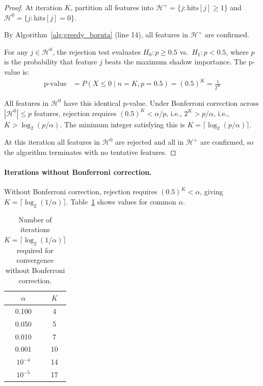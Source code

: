 \documentclass[runningheads]{llncs}
\begin{document}
\begin{proof}
At iteration $K$, partition all features into $\mathcal{H}^+ = \{j : \text{hits}[j] \geq 1\}$ and $\mathcal{H}^0 = \{j : \text{hits}[j] = 0\}$.

By Algorithm~\ref{alg:greedy_boruta} (line 14), all features in $\mathcal{H}^+$ are confirmed.

For any $j \in \mathcal{H}^0$, the rejection test evaluates $H_0: p \geq 0.5$ vs.\ $H_1: p < 0.5$, where $p$ is the probability that feature $j$ beats the maximum shadow importance. The p-value is:
\begin{align*}
\text{p-value} &= P(X \leq 0 \mid n = K, p = 0.5) = (0.5)^K = \frac{1}{2^K}
\end{align*}

All features in $\mathcal{H}^0$ have this identical p-value. Under Bonferroni correction across $|\mathcal{H}^0| \leq p$ features, rejection requires $(0.5)^K < \alpha/p$, i.e., $2^K > p/\alpha$, i.e., $K > \log_2(p/\alpha)$. The minimum integer satisfying this is $K = \lceil \log_2(p/\alpha) \rceil$.

At this iteration all features in $\mathcal{H}^0$ are rejected and all in $\mathcal{H}^+$ are confirmed, so the algorithm terminates with no tentative features.
\end{proof}

\paragraph{Iterations without Bonferroni correction.} Without Bonferroni correction, rejection requires $(0.5)^K < \alpha$, giving $K = \lceil \log_2(1/\alpha) \rceil$. Table~\ref{tab:iterations_alpha_no_bonf} shows values for common $\alpha$.

\begin{table}[h]
\centering
\caption{Number of iterations $K = \lceil \log_2(1/\alpha) \rceil$ required for convergence without Bonferroni correction.}
\label{tab:iterations_alpha_no_bonf}
\begin{tabular}{cc}
\toprule
$\alpha$ & $K$ \\
\midrule
0.100 & 4 \\
0.050 & 5 \\
0.010 & 7 \\
0.001 & 10 \\
$10^{-4}$ & 14 \\
$10^{-5}$ & 17 \\
\bottomrule
\end{tabular}
\end{table}
\end{document}

